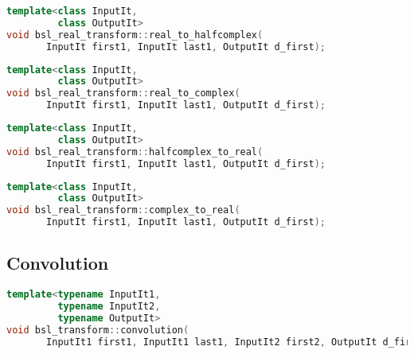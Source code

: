 \begin{lstlisting}[language=C++]
template<class InputIt,
         class OutputIt>
void bsl_real_transform::real_to_halfcomplex(
       InputIt first1, InputIt last1, OutputIt d_first);
\end{lstlisting}
\begin{lstlisting}[language=C++]
template<class InputIt,
         class OutputIt>
void bsl_real_transform::real_to_complex(
       InputIt first1, InputIt last1, OutputIt d_first);
\end{lstlisting}
\begin{lstlisting}[language=C++]
template<class InputIt,
         class OutputIt>
void bsl_real_transform::halfcomplex_to_real(
       InputIt first1, InputIt last1, OutputIt d_first);
\end{lstlisting}
\begin{lstlisting}[language=C++]
template<class InputIt,
         class OutputIt>
void bsl_real_transform::complex_to_real(
       InputIt first1, InputIt last1, OutputIt d_first);
\end{lstlisting}

\subsection{Convolution}
    
\begin{lstlisting}[language=C++]
template<typename InputIt1,
         typename InputIt2,
         typename OutputIt>
void bsl_transform::convolution(
       InputIt1 first1, InputIt1 last1, InputIt2 first2, OutputIt d_first);
\end{lstlisting}

%  
%  
%  


